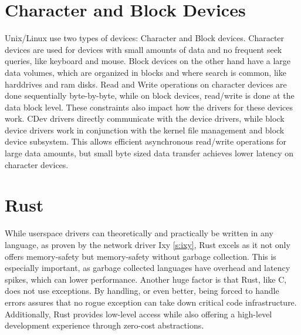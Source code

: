 \section{Character and Block Devices}
Unix/Linux use two types of devices: Character and Block devices. Character devices are used for devices with small amounts of data and no frequent seek queries, like keyboard and mouse. Block devices on the other hand have a large data volumes, which are organized in blocks and where search is common, like harddrives and ram disks.
Read and Write operations on character devices are done sequentially byte-by-byte, while on block devices, read/write is done at the data block level.
These constraints also impact how the drivers for these devices work. CDev drivers directly communicate with the device drivers, while block device drivers work in conjunction with the kernel file management and block device subsystem. This allows efficient asynchronous read/write operations for large data amounts, but small byte sized data transfer achieves lower latency on character devices.

\section{Rust}
While userspace drivers can theoretically and practically be written in any language, as proven by the network driver Ixy \autoref{s:ixy}, Rust excels as it not only offers memory-safety but memory-safety without garbage collection. This is especially important, as garbage collected languages have overhead and latency spikes, which can lower performance. Another huge factor is that Rust, like C, does not use exceptions. By handling, or even better, being forced to handle errors assures that no rogue exception can take down critical code infrastructure.
Additionally, Rust provides low-level access while also offering a high-level development experience through zero-cost abstractions.